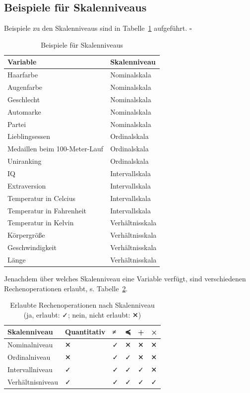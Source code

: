 \documentclass[
  letterpaper,
  oneside,
  open=any]{scrbook}
\theoremstyle{definition}
\theoremstyle{definition}
\theoremstyle{definition}
\theoremstyle{remark}
\begin{document}
\subsection{Beispiele für
Skalenniveaus}\label{beispiele-fuxfcr-skalenniveaus}

Beispiele zu den Skalenniveaus sind in Tabelle~\ref{tbl-skalen-bsps}
aufgeführt. \(\square\)

\begin{longtable}[]{@{}ll@{}}

\caption{\label{tbl-skalen-bsps}Beispiele für Skalenniveaus}

\tabularnewline

\toprule\noalign{}
Variable & Skalenniveau \\
\midrule\noalign{}
\endhead
\bottomrule\noalign{}
\endlastfoot
Haarfarbe & Nominalskala \\
Augenfarbe & Nominalskala \\
Geschlecht & Nominalskala \\
Automarke & Nominalskala \\
Partei & Nominalskala \\
Lieblingsessen & Ordinalskala \\
Medaillen beim 100-Meter-Lauf & Ordinalskala \\
Uniranking & Ordinalskala \\
IQ & Intervallskala \\
Extraversion & Intervallskala \\
Temperatur in Celcius & Intervallskala \\
Temperatur in Fahrenheit & Intervallskala \\
Temperatur in Kelvin & Verhältnisskala \\
Körpergröße & Verhältnisskala \\
Geschwindigkeit & Verhältnisskala \\
Länge & Verhältnisskala \\

\end{longtable}

Jenachdem über welches Skalenniveau eine Variable verfügt, sind
verschiedenen Rechenoperationen erlaubt, s.
{Tabelle~\ref{tbl-skalenniveaus-pdf}}.

\begin{longtable}[]{@{}llllll@{}}

\caption{\label{tbl-skalenniveaus-pdf}Erlaubte Rechenoperationen nach
Skalenniveau (ja, erlaubt: ✓; nein, nicht erlaubt: ✕)}

\tabularnewline

\toprule\noalign{}
Skalenniveau & Quantitativ & ≠ & ≼ & + & × \\
\midrule\noalign{}
\endhead
\bottomrule\noalign{}
\endlastfoot
Nominalniveau & ✕ & ✓ & ✕ & ✕ & ✕ \\
Ordinalniveau & ✕ & ✓ & ✓ & ✕ & ✕ \\
Intervallniveau & ✓ & ✓ & ✓ & ✓ & ✕ \\
Verhältnisniveau & ✓ & ✓ & ✓ & ✓ & ✓ \\

\end{longtable}
\end{document}
